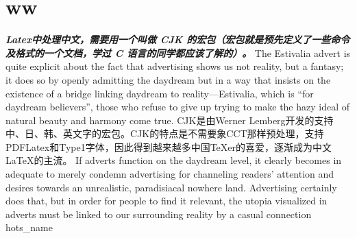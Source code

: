 \documentclass[UTF8]{ctexart}
\begin{document}
\section{ww}
\textbf{\emph{Latex中处理中文，需要用一个叫做 CJK 的宏包（宏包就是预先定义了一些命令及格式的一个文档，学过 C 语言的同学都应该了解的）。}}
The Estivalia advert is quite explicit about the fact that advertising shows us not reality, but a fantasy; it does so by openly admitting the daydream but in a way that insists on the existence of a bridge linking daydream to reality—Estivalia, which is “for daydream believers”, those who refuse to give up trying to make the hazy ideal of natural beauty and harmony come true.
CJK是由Werner Lemberg开发的支持中、日、韩、英文字的宏包。CJK的特点是不需要象CCT那样预处理，支持PDFLatex和Type1字体，因此得到越来越多中国TeXer的喜爱，逐渐成为中文LaTeX的主流。
If adverts function on the daydream level, it clearly becomes in adequate to merely condemn advertising for channeling readers’ attention and desires towards an unrealistic, paradisiacal nowhere land. Advertising certainly does that, but in order for people to find it relevant, the utopia visualized in adverts must be linked to our surrounding reality by a casual connection
hots\_name
\end{document}
